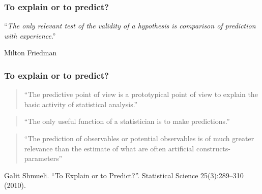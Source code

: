 \begin{frame}
\frametitle{To explain or to predict?}
\begin{center}
{\huge ``\emph{The only relevant test of the validity of a hypothesis is comparison of prediction with experience}.''\par}
\vspace{1cm}
Milton Friedman
\end{center}
\end{frame}

\begin{frame}
\frametitle{To explain or to predict?}

\begin{quote}
``The predictive point of view is a prototypical point of view to explain the basic activity of statistical analysis.''
\par {}
\end{quote}

\begin{quote}
``The only useful function of a statistician is to make predictions.''
\par {}
\end{quote}

\begin{quote}
``The prediction of observables or potential observables is of much greater relevance than the estimate of what are often artificial constructs-parameters''
\par{}
\end{quote}

\begin{center}
\begin{tiny}
Galit Shmueli. ``To Explain or to Predict?''. Statistical Science 25(3):289--310 (2010).
\end{tiny}
\end{center}
\end{frame}

